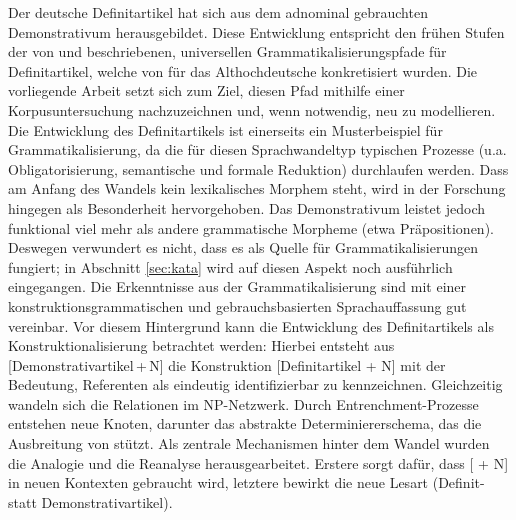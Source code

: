 Der deutsche Definitartikel hat sich aus dem adnominal gebrauchten Demonstrativum  herausgebildet. Diese Entwicklung entspricht den frühen Stufen der von \textcite{Greenberg1978} und \textcite{Lehmann2015} beschriebenen, universellen Grammatikalisierungspfade für Definitartikel, welche von \textcite{Schmuck2014} für das Althochdeutsche konkretisiert wurden. Die vorliegende Arbeit setzt sich zum Ziel, diesen Pfad mithilfe einer Korpusuntersuchung nachzuzeichnen und, wenn notwendig, neu zu modellieren. Die Entwicklung  des Definitartikels ist einerseits ein Musterbeispiel für Grammatikalisierung, da die für diesen Sprachwandeltyp typischen Prozesse (u.a. Obligatorisierung, semantische und formale Reduktion)  durchlaufen werden. Dass am Anfang des Wandels kein lexikalisches Morphem steht, wird in der Forschung hingegen als Besonderheit hervorgehoben. Das Demonstrativum leistet jedoch funktional viel mehr als andere grammatische Morpheme (etwa Präpositionen). Deswegen verwundert es nicht, dass es als Quelle für Grammatikalisierungen fungiert; in Abschnitt \ref{sec:kata} wird auf diesen Aspekt noch ausführlich eingegangen. Die Erkenntnisse aus der Grammatikalisierung sind mit einer konstruktionsgrammatischen und gebrauchsbasierten Sprachauffassung gut vereinbar. Vor diesem Hintergrund kann die Entwicklung des Definitartikels als Konstruktionalisierung betrachtet werden: Hierbei entsteht aus [Demonstrativartikel\,+\,N] die Konstruktion [Definitartikel + N] mit der Bedeutung, Referenten als eindeutig identifizierbar zu kennzeichnen. Gleichzeitig wandeln sich die Relationen im NP-Netzwerk. Durch Entrenchment-Prozesse entstehen neue Knoten, darunter das abstrakte Determiniererschema, das die Ausbreitung von  stützt. Als zentrale Mechanismen hinter dem Wandel wurden die Analogie und die Reanalyse herausgearbeitet. Erstere sorgt dafür, dass [ + N] in neuen Kontexten gebraucht wird, letztere bewirkt die neue Lesart (Definit- statt Demonstrativartikel). 
